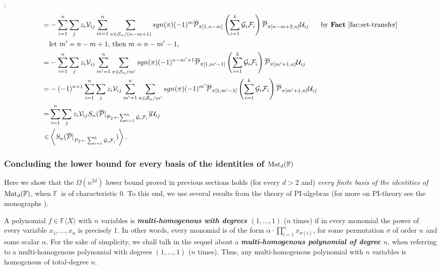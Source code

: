 \documentclass[12pt,reqno]{article}
\newcommand\F{\ensuremath{\mathbb F}}
\newcommand{\cd}{\cdot}
\newcommand{\matd}{{\ensuremath{{\rm Mat}_d(\F)}}}
\newcommand{\freea}{\ensuremath{\F\langle X\rangle}}
\newenvironment{proof}{\QuadSpace\par\noindent{\bf Proof}:}{\EndProof\HalfSpace}
\newcommand{\QuadSpace}{\vspace{0.25\baselineskip}}
\newcommand{\HalfSpace}{\vspace{0.5\baselineskip}}
\newcommand{\EndProof}{ \hfill \vrule width 1ex height 1ex depth 0pt }
\renewcommand{\t}[1]{\overline{#1}}
\renewcommand{\S}{\mathcal{S}}
\newcommand{\ideal}[1]{\ensuremath{\left\langle #1\right\rangle}}
\newcommand\ii{{\cal I}}
\newcommand{\U}{\mathcal U_{ij}}
\newcommand{\V}{\mathcal V_{ij}}
\begin{document}
\begin{proof}
\begin{align*}
=&-\sum_{i=1}^n \sum_j z_i \V\sum_{m=1}^{n} \sum_{\pi\in \S_{n}/(n-m+1)}sgn(\pi)(-1)^m \t{\mathcal P}_{\pi[1,n-m]}\left(\sum_{i=1}^k\mathcal {G}_i \mathcal {F}_i\right) \t{\mathcal P}_{\pi[n-m+2,n]} \U~~~~~\text{by \textbf{Fact} \ref{fac:set-transfer}}\\
&\text{let $m'=n-m+1$, then $m=n-m'-1$,}\\
=& - \sum_{i=1}^n \sum_j z_i \V\sum_{m'=1}^{n} \sum_{\pi\in \S_{n}/m'}sgn(\pi)(-1)^{n-m'+1} \t{\mathcal P}_{\pi[1,m'-1]}\left(\sum_{i=1}^k\mathcal {G}_i \mathcal {F}_i\right) \t{\mathcal P}_{\pi[m'+1,n]} \U\\
=& -(-1)^{n+1} \sum_{i=1}^n \sum_j z_i \V\sum_{m'=1}^{n} \sum_{\pi\in \S_{n}/m'}sgn(\pi)(-1)^{m'} \t{\mathcal P}_{\pi[1,m'-1]}\left(\sum_{i=1}^k\mathcal {G}_i \mathcal {F}_i\right) \t{\mathcal P}_{\pi[m'+1,n]} \U\\
=&  \sum_{i=1}^n \sum_j z_i \V S_{n}(\t{\mathcal P}|_{ \mathcal P _\ii\leftarrow \sum_{i=1}^k\mathcal {G}_i \mathcal {F}_i})\U\\
\in&\ideal{S_{n}(\t{\mathcal P}|_{ \mathcal P _\ii\leftarrow \sum_{i=1}^k\mathcal {G}_i \mathcal {F}_i})}.
\end{align*}
\end{proof}



\subsubsection{Concluding the lower bound for every basis of the identities of \matd}
\label{sec:conc-for-any-basis-of-matd}



Here we show that the $\Omega(n^{2d})$ lower bound proved in previous sections holds (for every $d>2$ and) \emph{every  finite basis of the identities of \matd}, when \F\ is of characteristic $0$.
To this end, we use several results from the theory of PI-algebras (for more on PI-theory see the monographs \cite{Row80,Dre99}).


A polynomial $f\in \freea$ with $n$ variables is \textbf{\emph{multi-homogenous with degrees $(1,\ldots,1)$}} ($n$ times) if in every monomial the power of every variable $x_1,\ldots,x_n$ is precisely 1. In other words, every monomial is of the form $\alpha\cd \prod _{i=1}^n x_{\sigma(i)}$, for some permutation $\sigma$ of order $n$ and some scalar $\alpha$. For the sake of simplicity, we shall talk in the sequel about a \textit{\textbf{multi-homogenous polynomial of degree $n$}}, when referring to a multi-homogenous polynomial with degrees $(1,\ldots,1)$ ($n$ times). Thus, any multi-homogenous polynomial with $n$ variables is homogenous of total-degree  $n$.
\end{document}
